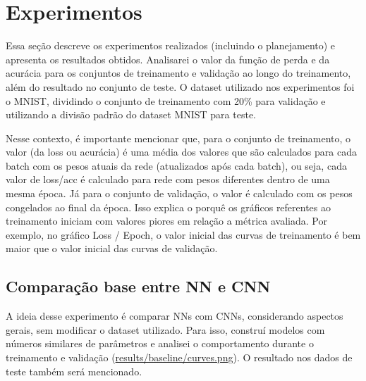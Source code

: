 \documentclass[11pt,a4paper]{article}
\begin{document}
\section{Experimentos}

Essa seção descreve os experimentos realizados (incluindo o planejamento) e apresenta os resultados obtidos. Analisarei o valor da função de perda e da acurácia para os conjuntos de treinamento e validação ao longo do treinamento, além do resultado no conjunto de teste. O dataset utilizado nos experimentos foi o MNIST, dividindo o conjunto de treinamento com 20\% para validação e utilizando a divisão padrão do dataset MNIST para teste. 

\hypertarget{explicacao-dinamica-loss}{Nesse contexto, é importante mencionar que, para o conjunto de treinamento, o valor (da loss ou acurácia) é uma média dos valores que são calculados para cada batch com os pesos atuais da rede (atualizados após cada batch), ou seja, cada valor de loss/acc é calculado para rede com pesos diferentes dentro de uma mesma época. Já para o conjunto de validação, o valor é calculado com os pesos congelados ao final da época. Isso explica o porquê os gráficos referentes ao treinamento iniciam com valores piores em relação a métrica avaliada. Por exemplo, no gráfico Loss / Epoch, o valor inicial das curvas de treinamento é bem maior que o valor inicial das curvas de validação.}

\subsection{Comparação base entre NN e CNN}

A ideia desse experimento é comparar NNs com CNNs, considerando aspectos gerais, sem modificar o dataset utilizado. Para isso, construí modelos com números similares de parâmetros e analisei o comportamento durante o treinamento e validação (\href{https://github.com/deconr/MAC5921-DeepLearning/blob/main/ep1/results/baseline/curves.png}{results/baseline/curves.png}). O resultado nos dados de teste também será mencionado.
\end{document}
